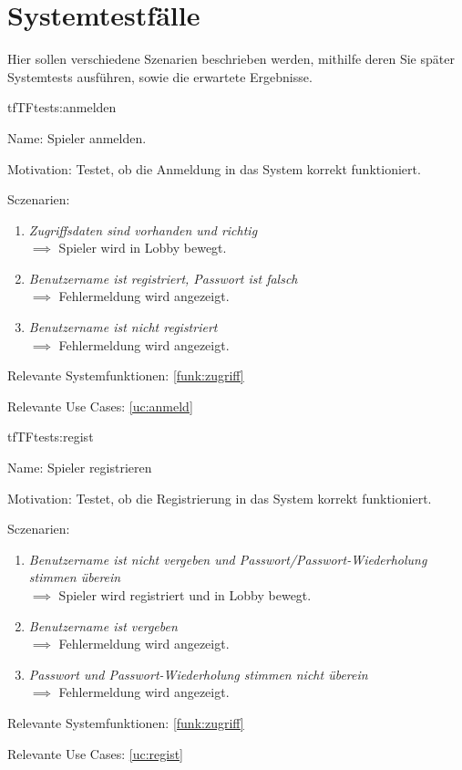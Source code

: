 \chapter{Systemtestfälle}

Hier sollen verschiedene Szenarien beschrieben werden, mithilfe deren Sie später Systemtests ausführen, sowie die erwartete Ergebnisse.

\setcounter{tf}{10}

\begin{description}[leftmargin=5em, style=sameline]

\begin{lhp}{tf}{TF}{tests:anmelden}
	\item [Name:] Spieler anmelden.
	\item [Motivation:] Testet, ob die Anmeldung in das System korrekt funktioniert.
	\item [Sczenarien:] \hfill
		\begin{enumerate}
			\item \textit{Zugriffsdaten sind vorhanden und richtig} \\ $\implies$ Spieler wird in Lobby bewegt.
			\item \textit{Benutzername ist registriert, Passwort ist falsch} \\ $\implies$ Fehlermeldung wird angezeigt.
			\item \textit{Benutzername ist nicht registriert} \\ $\implies$ Fehlermeldung wird angezeigt.
		\end{enumerate}
	\item [Relevante Systemfunktionen:] \ref{funk:zugriff}
	\item [Relevante Use Cases:] \ref{uc:anmeld}
\end{lhp}

\begin{lhp}{tf}{TF}{tests:regist}
	\item [Name:] Spieler registrieren
	\item [Motivation:] Testet, ob die Registrierung in das System korrekt funktioniert.
	\item [Sczenarien:] \hfill
	\begin{enumerate}
		\item \textit{Benutzername ist nicht vergeben und Passwort/Passwort-Wiederholung stimmen überein} \\ $\implies$ Spieler wird registriert und in Lobby bewegt.
		\item \textit{Benutzername ist vergeben} \\ $\implies$ Fehlermeldung wird angezeigt.
		\item \textit{Passwort und Passwort-Wiederholung stimmen nicht überein} \\ $\implies$ Fehlermeldung wird angezeigt.
	\end{enumerate}
	\item [Relevante Systemfunktionen:] \ref{funk:zugriff}
	\item [Relevante Use Cases:] \ref{uc:regist}
\end{lhp}


\end{description}
